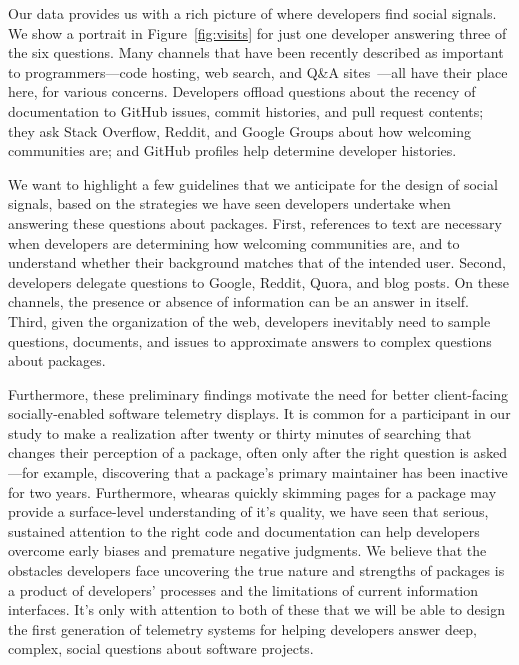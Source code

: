 Our data provides us with a rich picture of where developers find social signals.
We show a portrait in Figure~\ref{fig:visits} for just one developer answering three of the six questions.
Many channels that have been recently described as important to programmers---code hosting, web search, and Q\&A sites~\cite{storey_how_2016}---all have their place here, for various concerns.
Developers offload questions about the recency of documentation to GitHub issues, commit histories, and pull request contents;
they ask Stack Overflow, Reddit, and Google Groups about how welcoming communities are;
and GitHub profiles help determine developer histories.

We want to highlight a few guidelines that we anticipate for the design of social signals, based on the strategies we have seen developers undertake when answering these questions about packages.
First, references to text are necessary when developers are determining how welcoming communities are, and to understand whether their background matches that of the intended user.
Second, developers delegate questions to Google, Reddit, Quora, and blog posts.
On these channels, the presence or absence of information can be an answer in itself.
Third, given the organization of the web, developers inevitably need to sample questions, documents, and issues to approximate answers to complex questions about packages.

Furthermore, these preliminary findings motivate the need for better client-facing socially-enabled software telemetry displays.
It is common for a participant in our study to make a realization after twenty or thirty minutes of searching that changes their perception of a package, often only after the right question is asked---for example, discovering that a package's primary maintainer has been inactive for two years.
Furthermore, whearas quickly skimming pages for a package may provide a surface-level understanding of it's quality, we have seen that serious, sustained attention to the right code and documentation can help developers overcome early biases and premature negative judgments.
We believe that the obstacles developers face uncovering the true nature and strengths of packages is a product of developers' processes and the limitations of current information interfaces.
It's only with attention to both of these that we will be able to design the first generation of telemetry systems for helping developers answer deep, complex, social questions about software projects.

